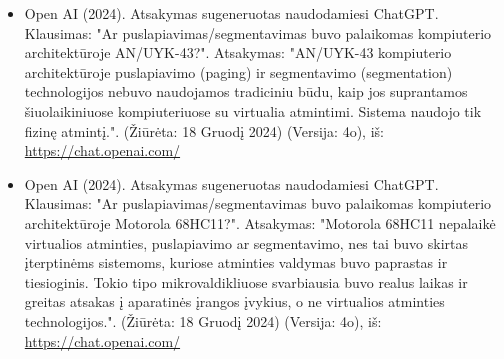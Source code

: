 \documentclass[a4paper,12pt]{article}
\begin{document}
\begin{itemize}
    \item Open AI (2024). Atsakymas sugeneruotas naudodamiesi ChatGPT. Klausimas: "Ar puslapiavimas/segmentavimas buvo palaikomas kompiuterio architektūroje AN/UYK-43?". Atsakymas: "AN/UYK-43 kompiuterio architektūroje puslapiavimo (paging) ir segmentavimo (segmentation) technologijos nebuvo naudojamos tradiciniu būdu, kaip jos suprantamos šiuolaikiniuose kompiuteriuose su virtualia atmintimi. Sistema naudojo tik fizinę atmintį.". (Žiūrėta: 18 Gruodį 2024) (Versija: 4o), iš: \url{https://chat.openai.com/}
    \item Open AI (2024). Atsakymas sugeneruotas naudodamiesi ChatGPT. Klausimas: "Ar puslapiavimas/segmentavimas buvo palaikomas kompiuterio architektūroje Motorola 68HC11?". Atsakymas: "Motorola 68HC11 nepalaikė virtualios atminties, puslapiavimo ar segmentavimo, nes tai buvo skirtas įterptinėms sistemoms, kuriose atminties valdymas buvo paprastas ir tiesioginis. Tokio tipo mikrovaldikliuose svarbiausia buvo realus laikas ir greitas atsakas į aparatinės įrangos įvykius, o ne virtualios atminties technologijos.". (Žiūrėta: 18 Gruodį 2024) (Versija: 4o), iš: \url{https://chat.openai.com/}
\end{itemize}
\end{document}
